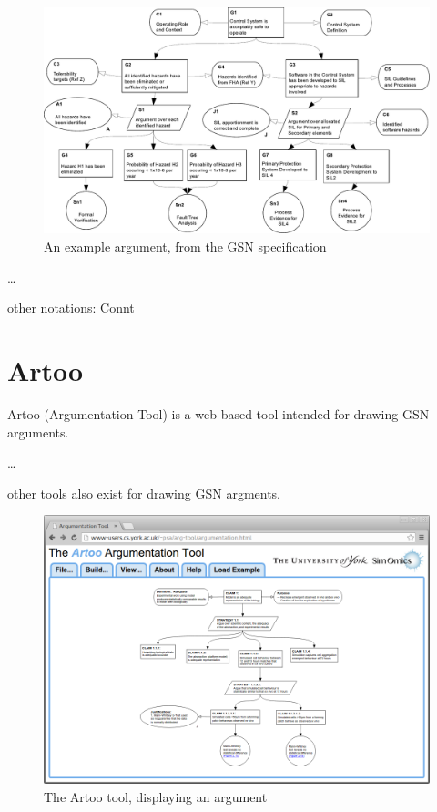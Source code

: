\documentclass[authoryearcitations]{UoYCSproject}
\begin{document}
\begin{figure}
    \centering
    \includegraphics[width=\textwidth]{example_argument.pdf}
    \caption{An example argument, from the GSN specification}
\end{figure}

\ldots

other notations: Connt

\section{Artoo}

Artoo (Argumentation Tool) is a web-based tool intended for drawing GSN arguments.

\ldots

other tools also exist for drawing GSN argments.

\begin{figure}
    \centering
    \includegraphics[width=\textwidth]{graphics/artoo_screenshot.png}
    \caption{The Artoo tool, displaying an argument }
\end{figure}
\end{document}
